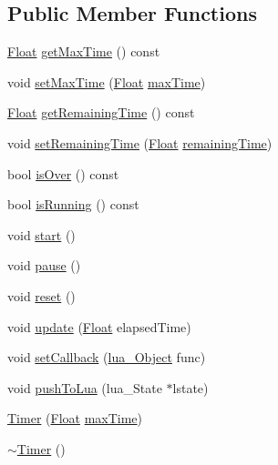 \subsection*{Public Member Functions}
\begin{DoxyCompactItemize}
\item 
\hyperlink{namespaceZeta_a1e0a1265f9b3bd3075fb0fabd39088ba}{Float} \hyperlink{classZeta_1_1Timer_ab85e37cab2ccf91c3affc0a3d2def7f7}{get\+Max\+Time} () const 
\item 
void \hyperlink{classZeta_1_1Timer_a7eea492065bdbc64478e2e0396550e22}{set\+Max\+Time} (\hyperlink{namespaceZeta_a1e0a1265f9b3bd3075fb0fabd39088ba}{Float} \hyperlink{classZeta_1_1Timer_a9a9cce102e64f634f3bcc1653f94d92f}{max\+Time})
\item 
\hyperlink{namespaceZeta_a1e0a1265f9b3bd3075fb0fabd39088ba}{Float} \hyperlink{classZeta_1_1Timer_a4bf3c4d64122f88c10f914c095e52756}{get\+Remaining\+Time} () const 
\item 
void \hyperlink{classZeta_1_1Timer_a53b2dc0910e189266f89ca297476f707}{set\+Remaining\+Time} (\hyperlink{namespaceZeta_a1e0a1265f9b3bd3075fb0fabd39088ba}{Float} \hyperlink{classZeta_1_1Timer_a65a7dfa8c401787c7916a844b0c07965}{remaining\+Time})
\item 
bool \hyperlink{classZeta_1_1Timer_aa1638624d8a71298110e97486ac4151b}{is\+Over} () const 
\item 
bool \hyperlink{classZeta_1_1Timer_a5eb3032815aee63bbd6093deaa26dcea}{is\+Running} () const 
\item 
void \hyperlink{classZeta_1_1Timer_ae0d0528ed8c364b6d33e0573c1a8ce3c}{start} ()
\item 
void \hyperlink{classZeta_1_1Timer_a256a4aba4a28450bd8a84c67a76b6271}{pause} ()
\item 
void \hyperlink{classZeta_1_1Timer_a88813a4cbfd7bbf49ce15e14e89b7b88}{reset} ()
\item 
void \hyperlink{classZeta_1_1Timer_a4e446b9abbac5ed2b74bf029d81e8933}{update} (\hyperlink{namespaceZeta_a1e0a1265f9b3bd3075fb0fabd39088ba}{Float} elapsed\+Time)
\item 
void \hyperlink{classZeta_1_1Timer_adc0df535bfb0b30d85a3209f08bc1eb7}{set\+Callback} (\hyperlink{ZetaConfig_8hpp_ae7be32b73848041a60f2412f72bbb221}{lua\+\_\+\+Object} func)
\item 
void \hyperlink{classZeta_1_1Timer_aa04d9cc692f5a21d2908bc0ae4c4d6c3}{push\+To\+Lua} (lua\+\_\+\+State $\ast$lstate)
\item 
\hyperlink{classZeta_1_1Timer_a0679009352d7d7c85e5cc73046085720}{Timer} (\hyperlink{namespaceZeta_a1e0a1265f9b3bd3075fb0fabd39088ba}{Float} \hyperlink{classZeta_1_1Timer_a9a9cce102e64f634f3bcc1653f94d92f}{max\+Time})
\item 
\hyperlink{classZeta_1_1Timer_a93506f6aeb740137fc4d58c7fa4276c5}{$\sim$\+Timer} ()
\end{DoxyCompactItemize}
